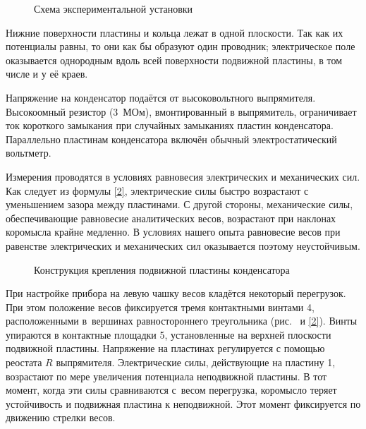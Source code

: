 \begin{figure}[h!]
    \centering
    \caption{Схема экспериментальной установки}
\end{figure}

Нижние поверхности пластины и кольца лежат в одной плоскости. Так как их
потенциалы равны, то они как бы образуют один
проводник; электрическое поле оказывается однородным вдоль всей поверхности
подвижной пластины, в том числе и у её краев.

Напряжение на конденсатор подаётся от высоковольтного выпрямителя. Высокоомный
резистор (3~МОм), вмонтированный в
выпрямитель, ограничивает ток короткого замыкания при случайных замыканиях
пластин конденсатора. Параллельно пластинам
конденсатора включён обычный электростатический вольтметр.

Измерения проводятся в условиях равновесия электрических и механических сил. Как
следует из формулы \eqref{2},
электрические силы быстро возрастают с уменьшением зазора между пластинами. С
другой стороны, механические силы,
обеспечивающие равновесие аналитических весов, возрастают при наклонах коромысла
крайне медленно. В условиях нашего опыта равновесие весов при равенстве
электрических и механических сил оказывается поэтому неустойчивым.

\begin{wrapfigure}[18]{o}{0.35\textwidth}
	\caption{Конструкция крепления подвижной пластины конденсатора}
\end{wrapfigure}

При настройке прибора на левую чашку весов кладётся некоторый перегрузок. При
этом положение весов фиксируется тремя
контактными винтами 4, расположенными в~вершинах равностороннего треугольника
(рис.~ и \eqref{2}). Винты упираются в
контактные площадки 5, установленные на верхней плоскости подвижной пластины.
Напряжение на пластинах регулируется с
помощью реостата $R$ выпрямителя. Электрические силы, действующие на пластину 1,
возрастают по мере увеличения
потенциала неподвижной пластины. В тот момент, когда эти силы сравниваются
с~весом перегрузка, коромысло теряет
устойчивость и подвижная пластина  к неподвижной. Этот момент
фиксируется по движению стрелки весов.

